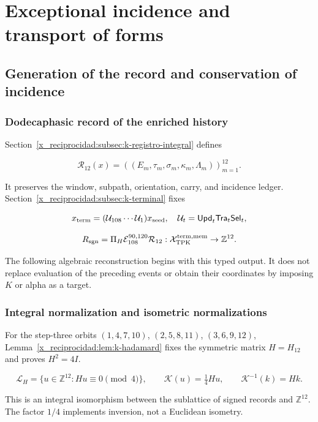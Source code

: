 \chapter{Exceptional incidence and transport of forms}
\label{x_reciprocidad:nuclear:4}
\section{Generation of the record and conservation of incidence}

\subsection{Dodecaphasic record of the enriched history}

Section~\ref{x_reciprocidad:subsec:k-registro-integral} defines

\[
\mathcal R_{12}(x)=((E_m,\tau_m,\sigma_m,\kappa_m,\Lambda_m))_{m=1}^{12}.
\]

It preserves the window, subpath, orientation, carry, and incidence ledger. Section~\ref{x_reciprocidad:subsec:k-terminal} fixes

\[
x_{\rm term}=(\mathcal U_{108}\cdots\mathcal U_1)x_{\rm seed},
\quad \mathcal U_t=\mathsf{Upd}_t\mathsf{Tra}_t\mathsf{Sel}_t,
\]

\[
R_{\rm sgn}=\Pi_H\mathcal E_{108}^{90,120}\mathcal R_{12}:
\mathcal X_{\rm TPK}^{\rm term,mem}\to\mathbb Z^{12}.
\]

The following algebraic reconstruction begins with this typed output. It does not replace evaluation of the preceding events or obtain their coordinates by imposing \(K\) or alpha as a target.

\subsection{Integral normalization and isometric normalizations}

For the step-three orbits \((1,4,7,10)\), \((2,5,8,11)\), \((3,6,9,12)\), Lemma~\ref{x_reciprocidad:lem:k-hadamard} fixes the symmetric matrix \(H=H_{12}\) and proves \(H^2=4I\).

\[
\mathcal L_H=\{u\in\mathbb Z^{12}:Hu\equiv0\pmod4\},
\qquad \mathscr K(u)=\tfrac14Hu,
\qquad \mathscr K^{-1}(k)=Hk.
\]

This is an integral isomorphism between the sublattice of signed records and \(\mathbb Z^{12}\). The factor \(1/4\) implements inversion, not a Euclidean isometry.

